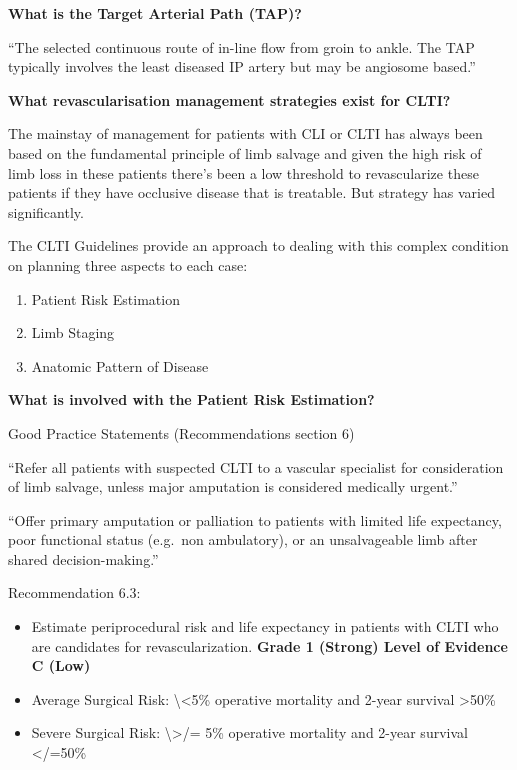 \documentclass[
]{book}
\begin{document}
\textbf{What is the Target Arterial Path (TAP)?}

``The selected continuous route of in-line flow from groin to ankle. The
TAP typically involves the least diseased IP artery but may be angiosome
based.''

\textbf{What revascularisation management strategies exist for CLTI?}

The mainstay of management for patients with CLI or CLTI has always been
based on the fundamental principle of limb salvage and given the high
risk of limb loss in these patients there's been a low threshold to
revascularize these patients if they have occlusive disease that is
treatable. But strategy has varied significantly.

The CLTI Guidelines provide an approach to dealing with this complex
condition on planning three aspects to each case:

\begin{enumerate}
\def\labelenumi{\arabic{enumi}.}
\item
  Patient Risk Estimation
\item
  Limb Staging
\item
  Anatomic Pattern of Disease
\end{enumerate}

\textbf{What is involved with the Patient Risk Estimation?}

Good Practice Statements (Recommendations section 6)

``Refer all patients with suspected CLTI to a vascular specialist for
consideration of limb salvage, unless major amputation is considered
medically urgent.''

``Offer primary amputation or palliation to patients with limited life
expectancy, poor functional status (e.g.~non ambulatory), or an
unsalvageable limb after shared decision-making.''

Recommendation 6.3:

\begin{itemize}
\item
  Estimate periprocedural risk and life expectancy in patients with
  CLTI who are candidates for revascularization. \textbf{Grade 1 (Strong)
  Level of Evidence C (Low)}
\item
  Average Surgical Risk: \textbackslash\textless5\% operative mortality and 2-year
  survival \textgreater50\%
\item
  Severe Surgical Risk: \textbackslash\textgreater/= 5\% operative mortality and 2-year
  survival \textless/=50\%
\end{itemize}
\end{document}
